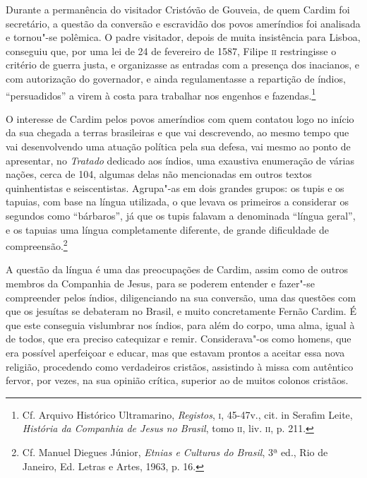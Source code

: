 Durante a permanência do visitador Cristóvão de Gouveia, de quem
Cardim foi secretário, a questão da conversão e escravidão dos povos
ameríndios foi analisada e tornou"-se polêmica. O padre visitador,
depois de muita insistência para Lisboa, conseguiu que, por uma lei de
24 de fevereiro de 1587, Filipe \textsc{ii} restringisse o critério de guerra
justa, e organizasse as entradas com a presença dos inacianos, e com
autorização do governador, e ainda regulamentasse a repartição de
índios, ``persuadidos'' a virem à costa para trabalhar nos engenhos e
fazendas.\footnote{ Cf. Arquivo Histórico Ultramarino,
\textit{Registos}, \textsc{i}, 45-47v., cit. in Serafim Leite, \textit{História
da Companhia de Jesus no Brasil}, tomo \textsc{ii}, liv. \textsc{ii}, p. 211.}

O interesse de Cardim pelos povos ameríndios com quem contatou logo
no início da sua chegada a terras brasileiras e que vai descrevendo, ao
mesmo tempo que vai desenvolvendo uma atuação política pela sua
defesa, vai mesmo ao ponto de apresentar, no \textit{Tratado} dedicado
aos índios, uma exaustiva enumeração de várias nações, cerca de 104, 
algumas delas não mencionadas em outros textos quinhentistas e
seiscentistas. Agrupa"-as em dois grandes grupos: os tupis e os
tapuias, com base na língua utilizada, o que levava os
primeiros a considerar os segundos como ``bárbaros'', já que os tupis
falavam a denominada ``língua geral'', e os tapuias uma língua
completamente diferente, de grande dificuldade de
compreensão.\footnote{ Cf. Manuel Diegues Júnior, \textit{Etnias e
Culturas do Brasil}, 3ª ed., Rio de Janeiro, Ed. Letras e Artes, 1963, p. 16.}

A questão da língua é uma das preocupações de Cardim, assim
como de outros membros da Companhia de Jesus, para se poderem entender
e fazer"-se compreender pelos índios, diligenciando na sua conversão, 
uma das questões com que os jesuítas se debateram no Brasil, e muito
concretamente Fernão Cardim. É que este conseguia vislumbrar nos
índios, para além do corpo, uma alma, igual à de todos, que era preciso
catequizar e remir. Considerava"-os como homens, que era possível
aperfeiçoar e educar, mas que estavam prontos a aceitar essa nova
religião, procedendo como verdadeiros cristãos, assistindo à missa com
autêntico fervor, por vezes, na sua opinião crítica, superior ao de
muitos colonos cristãos.

